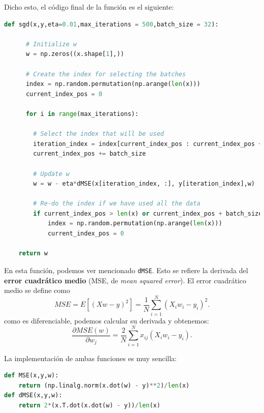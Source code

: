 \documentclass[12pt]{scrartcl}
\begin{document}
{Dicho esto, el código final de la función es el siguiente:
\begin{lstlisting}[language=python]
  def sgd(x,y,eta=0.01,max_iterations = 500,batch_size = 32):

	  # Initialize w
	  w = np.zeros((x.shape[1],))

	  # Create the index for selecting the batches
	  index = np.random.permutation(np.arange(len(x)))
	  current_index_pos = 0

	  for i in range(max_iterations):

	  	# Select the index that will be used
	  	iteration_index = index[current_index_pos : current_index_pos + batch_size]
	  	current_index_pos += batch_size

	  	# Update w
	  	w = w - eta*dMSE(x[iteration_index, :], y[iteration_index],w)

	  	# Re-do the index if we have used all the data
	  	if current_index_pos > len(x) or current_index_pos + batch_size > len(x):
	  		index = np.random.permutation(np.arange(len(x)))
	  		current_index_pos = 0

	return w
\end{lstlisting}

En esta función, podemos ver mencionado \lstinline{dMSE}. Esto se refiere la derivada del \textbf{error cuadrático medio }(MSE, de \emph{mean squared error}). 
El error cuadrático medio se define como
$$
MSE = E\left[(Xw - y)^2\right] =\frac{1}{N} \sum_{i=1}^N \left(X_i w_i - y_i\right)^2.
$$
como es diferenciable, podemos calcular su derivada y obtenemos:
$$
\frac{\partial MSE(w)}{\partial w_j} = \frac{2}{N} \sum_{i = 1 }^N  x_{ij}(X_i w_i - y_i).
$$

La implementación de ambas funciones es muy sencilla:
\begin{lstlisting}[language=python]
def MSE(x,y,w):
	return (np.linalg.norm(x.dot(w) - y)**2)/len(x)
def dMSE(x,y,w):
	return 2*(x.T.dot(x.dot(w) - y))/len(x)
\end{lstlisting}

}
\end{document}
